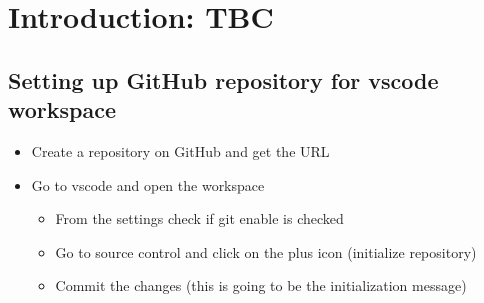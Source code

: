 
\section{Introduction: TBC}
\subsection{Setting up GitHub repository for vscode workspace}
\begin{itemize}
    \item Create a repository on GitHub and get the URL %
    \item Go to vscode and open the workspace
    \begin{itemize}
        \item From the settings check if git enable is checked
        \item Go to source control and click on the plus icon (initialize repository)
        \item Commit the changes (this is going to be the initialization message)
    \end{itemize}
\end{itemize}









\endinput
